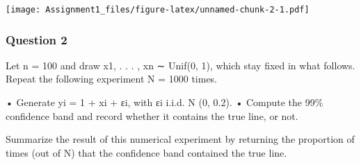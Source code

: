 \documentclass[
]{article}
\newenvironment{Shaded}{\begin{snugshade}}{\end{snugshade}}
\newcommand{\AttributeTok}[1]{\textcolor[rgb]{0.77,0.63,0.00}{#1}}
\newcommand{\CommentTok}[1]{\textcolor[rgb]{0.56,0.35,0.01}{\textit{#1}}}
\newcommand{\DecValTok}[1]{\textcolor[rgb]{0.00,0.00,0.81}{#1}}
\newcommand{\FloatTok}[1]{\textcolor[rgb]{0.00,0.00,0.81}{#1}}
\newcommand{\FunctionTok}[1]{\textcolor[rgb]{0.00,0.00,0.00}{#1}}
\newcommand{\NormalTok}[1]{#1}
\newcommand{\SpecialCharTok}[1]{\textcolor[rgb]{0.00,0.00,0.00}{#1}}
\newcommand{\StringTok}[1]{\textcolor[rgb]{0.31,0.60,0.02}{#1}}
\begin{document}
\begin{Shaded}
\end{Shaded}

\texttt{[image: Assignment1\_files/figure-latex/unnamed-chunk-2-1.pdf]}

\hypertarget{question-2}{%
\subsubsection{Question 2}\label{question-2}}

Let n = 100 and draw x1, . . . , xn ∼ Unif(0, 1), which stay fixed in
what follows. Repeat the following experiment N = 1000 times.

• Generate yi = 1 + xi + εi, with εi i.i.d. N (0, 0.2). • Compute the
99\% confidence band and record whether it contains the true line, or
not.

Summarize the result of this numerical experiment by returning the
proportion of times (out of N) that the confidence band contained the
true line.
\end{document}
